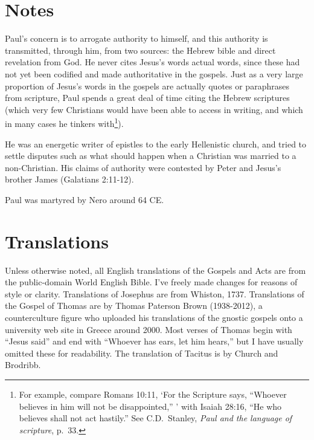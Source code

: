 \documentclass[10pt,twoside]{article} %
\newcommand{\quotesize}{\normalsize{}}
\newcommand{\maintextquotesize}{\renewcommand{\quotesize}{\large{}}}
\newcommand{\notequotesize}{\renewcommand{\quotesize}{\normalsize{}}}
\newcommand{\intex}[1]{\index[texts]{#1}}
\newcommand{\reftex}[1]{#1\intex{#1}}
\newenvironment{notesection}[1]{
  \setcounter{secnumdepth}{0}          %
  \section*{#1}
  \setcounter{secnumdepth}{2}          %
  \notequotesize
}%
{
  \maintextquotesize
}
\begin{document}
\begin{notesection}{Notes}

Paul's concern is to arrogate authority to himself, and this authority is transmitted, through him, from two
sources: the Hebrew bible and direct revelation from God.
He never cites Jesus's words actual words, since these had not yet been
codified and made authoritative in the gospels. 
Just as a very large proportion of Jesus's words in the gospels are actually quotes or paraphrases from scripture,
Paul spends a great deal of time citing the Hebrew scriptures (which very few
Christians would have been able to access in writing, and which in many cases he tinkers with\footnote{For example,
compare \reftex{Romans 10:11}, `For the Scripture says, ``Whoever believes in him will not be disappointed,'' '
with \reftex{Isaiah 28:16}, ``He who believes shall not act hastily.'' 
See C.D.~Stanley, \emph{Paul and the language of scripture}, p.~33.}\label{paul-tinkering}).


He was an energetic writer of epistles to the early Hellenistic church, and tried to settle disputes such
as what should happen when a Christian was married to a non-Christian.
His claims of authority were contested by Peter and Jesus's brother James (\reftex{Galatians 2:11-12}).

Paul was martyred by Nero around 64 CE.

\end{notesection}

\section*{Translations}

Unless otherwise noted, all English translations of the Gospels and Acts are from the public-domain World English Bible.
I've freely made changes for reasons of style or clarity.
Translations of Josephus are from Whiston, 1737.
Translations of the Gospel of Thomas are  by Thomas Paterson Brown (1938-2012),
a counterculture figure who uploaded his translations of the gnostic gospels onto a university web site
in Greece around 2000. Most verses of Thomas begin with ``Jesus said''
and end with ``Whoever has ears, let him hears,'' but I have usually omitted these for readability.\label{brown-trans}
The translation of Tacitus is by Church and Brodribb.

\end{document}
